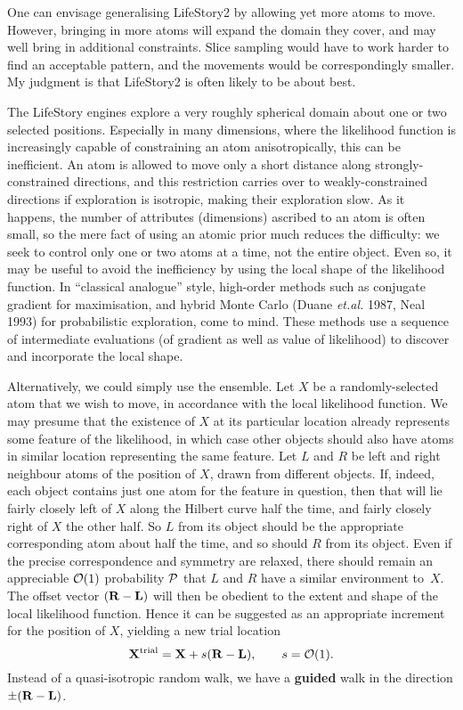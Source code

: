 One can envisage generalising LifeStory2 by allowing yet more atoms to move.
However, bringing in more atoms will expand the domain they cover, and may well bring in additional constraints.
Slice sampling would have to work harder to find an acceptable pattern, and the movements would be correspondingly smaller.
My judgment is that LifeStory2 is often likely to be about best.

\bigskip
{}
\smallskip

The LifeStory engines explore a very roughly spherical domain about one or two selected positions.
Especially in many dimensions, where the likelihood function is increasingly capable of constraining an atom anisotropically, this can be inefficient.
An atom is allowed to move only a short distance along strongly-constrained directions, 
and this restriction carries over to weakly-constrained directions if exploration is isotropic, making their exploration slow.
As it happens, the number of attributes (dimensions) ascribed to an atom is often small, so the mere fact of using an atomic prior much reduces the difficulty:
we seek to control only one or two atoms at a time, not the entire object.
Even so, it may be useful to avoid the inefficiency by using the local shape of the likelihood function.
In ``classical analogue'' style, high-order methods such as conjugate gradient for maximisation, 
and hybrid Monte Carlo (Duane {\it et.al.} 1987, Neal 1993) for probabilistic exploration, come to mind.
These methods use a sequence of intermediate evaluations (of gradient as well as value of likelihood) to discover and incorporate the local shape.

Alternatively, we could simply use the ensemble.
Let $X$ be a randomly-selected atom that we wish to move, in accordance with the local likelihood function.
We may presume that the existence of $X$ at its particular location already represents some feature of the likelihood, 
in which case other objects should also have atoms in similar location representing the same feature.
Let $L$ and $R$ be left and right neighbour atoms of the position of $X$, drawn from different objects.
If, indeed, each object contains just one atom for the feature in question, 
then that will lie fairly closely left of $X$ along the Hilbert curve half the time, and fairly closely right of $X$ the other half.
So $L$ from its object should be the appropriate corresponding atom about half the time, and so should $R$ from its object.
Even if the precise correspondence and symmetry are relaxed, 
there should remain an appreciable ${\cal O}(1)$ probability ${\cal P}$ that $L$ and $R$ have a similar environment to~$X$.
The offset vector $({\bf R} - {\bf L})$ will then be obedient to the extent and shape of the local likelihood function.
Hence it can be suggested as an appropriate increment for the position of $X$, yielding a new trial location
$$
    {\bf X}^{\rm trial} = {\bf X} + s({\bf R} - {\bf L}), \qquad s = {\cal O}(1).
$$
Instead of a quasi-isotropic random walk, we have a {\bf guided} walk in the direction $\pm({\bf R} - {\bf L})$.

